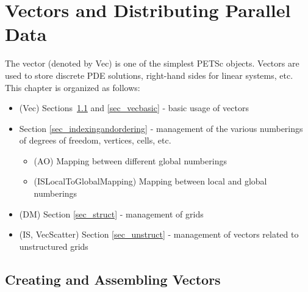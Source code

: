 %
%

\cleardoublepage
\chapter{Vectors and Distributing Parallel Data}
\label{chapter_vectors}

The vector (denoted by Vec) is one of the simplest PETSc
objects.  Vectors are used to store discrete PDE solutions, right-hand
sides for linear systems, etc. This chapter is organized as follows:

\begin{itemize}
\item (Vec) Sections~\ref{sec_veccreate} and \ref{sec_vecbasic} - basic usage of vectors
\item Section \ref{sec_indexingandordering} - management of the various numberings of
               degrees of freedom, vertices, cells, etc.
  \begin{itemize}
  \item (AO) Mapping between different global numberings
  \item (ISLocalToGlobalMapping) Mapping between local and global numberings
  \end{itemize}
\item (DM) Section \ref{sec_struct} - management of grids
\item (IS, VecScatter) Section \ref{sec_unstruct} - management of vectors related to
      unstructured grids
\end{itemize}

\section{Creating and Assembling Vectors}
\label{sec_veccreate}

